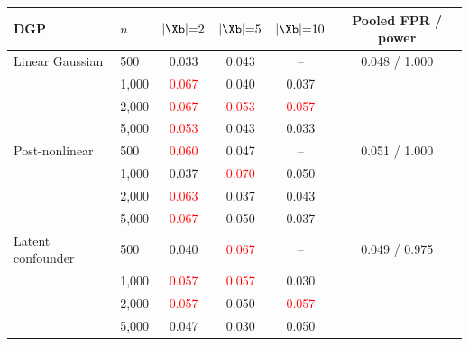 \begin{tabular}{llcccc}
    \toprule
    DGP & $n$ & $|\Xb|{=}2$ & $|\Xb|{=}5$ & $|\Xb|{=}10$ & Pooled FPR / power \\
    \midrule
    Linear Gaussian    & 500 & 0.033 & 0.043 & -- & 0.048 / 1.000 \\
                       & 1,000 & \textcolor{red}{0.067} & 0.040 & 0.037 &  \\
                       & 2,000 & \textcolor{red}{0.067} & \textcolor{red}{0.053} & \textcolor{red}{0.057} &  \\
                       & 5,000 & \textcolor{red}{0.053} & 0.043 & 0.033 &  \\
    \midrule
    Post-nonlinear     & 500 & \textcolor{red}{0.060} & 0.047 & -- & 0.051 / 1.000 \\
                       & 1,000 & 0.037 & \textcolor{red}{0.070} & 0.050 &  \\
                       & 2,000 & \textcolor{red}{0.063} & 0.037 & 0.043 &  \\
                       & 5,000 & \textcolor{red}{0.067} & 0.050 & 0.037 &  \\
    \midrule
    Latent confounder  & 500 & 0.040 & \textcolor{red}{0.067} & -- & 0.049 / 0.975 \\
                       & 1,000 & \textcolor{red}{0.057} & \textcolor{red}{0.057} & 0.030 &  \\
                       & 2,000 & \textcolor{red}{0.057} & 0.050 & \textcolor{red}{0.057} &  \\
                       & 5,000 & 0.047 & 0.030 & 0.050 &  \\
    \bottomrule
\end{tabular}
